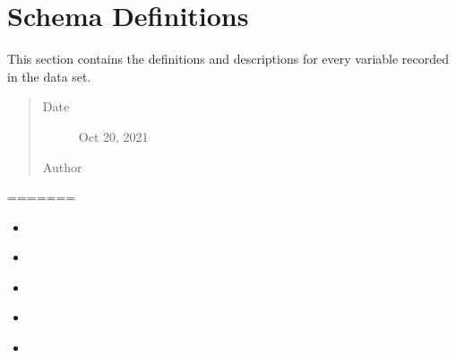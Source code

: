 \documentclass[letterpaper,10pt,english]{sphinxmanual}
\begin{document}
\section{Schema Definitions}
\label{\detokenize{database_schema:schema-definitions}}
\begin{sphinxShadowBox}

\sphinxAtStartPar
This section contains the definitions and descriptions for every variable recorded in the data set.
\begin{quote}\begin{description}
\item[{Date}] \leavevmode
\sphinxAtStartPar
Oct 20, 2021

\item[{Author}] \leavevmode
\sphinxAtStartPar
{}

\end{description}\end{quote}
=======
\label{\detokenize{schema_tables:id228}}{\hyperref[\detokenize{schema_tables:illegal-imprisonments}]{}}
\begin{itemize}
\item {} 
\sphinxAtStartPar
{}\label{\detokenize{schema_tables:id229}}{\hyperref[\detokenize{schema_tables:id64}]{}}

\item {} 
\sphinxAtStartPar
{}\label{\detokenize{schema_tables:id230}}{\hyperref[\detokenize{schema_tables:id65}]{}}

\item {} 
\sphinxAtStartPar
{}\label{\detokenize{schema_tables:id231}}{\hyperref[\detokenize{schema_tables:id66}]{}}

\end{itemize}

\item {} 
\sphinxAtStartPar
{}\label{\detokenize{schema_tables:id232}}{\hyperref[\detokenize{schema_tables:human-rights-category-code}]{}}
\begin{itemize}
\item {} 
\sphinxAtStartPar
{}\label{\detokenize{schema_tables:id233}}{\hyperref[\detokenize{schema_tables:id67}]{}}

\item {} 
\sphinxAtStartPar
{}\label{\detokenize{schema_tables:id234}}{\hyperref[\detokenize{schema_tables:id68}]{}}


\end{itemize}
\end{sphinxShadowBox}
\end{document}
